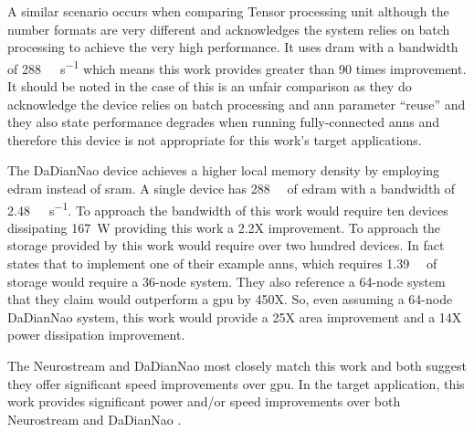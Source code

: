 A similar scenario occurs when comparing Tensor processing unit \cite{jouppi2017datacenter} although the number formats are very different and \cite{jouppi2017datacenter} acknowledges the system relies on batch processing to achieve the very high performance.
It uses \ac{dram} with a bandwidth of \SI[per-mode=symbol]{288}{\giga\bit\per\second} which means this work provides greater than 90 times improvement. 
It should be noted in the case of \cite{jouppi2017datacenter} this is an unfair comparison as they do acknowledge the device relies on batch processing and \ac{ann} parameter ``reuse'' and they also state performance degrades when running fully-connected \acp{ann} and therefore this device is not appropriate for this work's target applications.

The DaDianNao \cite{chen2016diannao} device achieves a higher local memory density by employing \ac{edram} instead of \ac{sram}. A single device has \SI[per-mode=symbol]{288}{\giga\bit} of \ac{edram} with a bandwidth of \SI[per-mode=symbol]{2.48}{\tera\bit\per\second}.
To approach the bandwidth of this work would require ten devices dissipating \SI[per-mode=symbol]{167}{\watt} providing this work a 2.2X improvement.
To approach the storage provided by this work would require over two hundred devices. 
In fact \cite{chen2016diannao} states that to implement one of their example \acp{ann}, which requires \SI[per-mode=symbol]{1.39}{\giga\byte} of storage would require a 36-node system. 
They also reference a 64-node system that they claim would outperform a \ac{gpu} by 450X.
So, even assuming a 64-node DaDianNao system, this work would provide a 25X area improvement and a 14X power dissipation improvement.

The Neurostream \cite{azarkhish2017neurostream} and DaDianNao \cite{chen2016diannao} most closely match this work and both suggest they offer significant speed improvements over \ac{gpu}.
In the target application, this work provides significant power and/or speed improvements over both Neurostream \cite{azarkhish2017neurostream} and DaDianNao \cite{chen2016diannao}.



